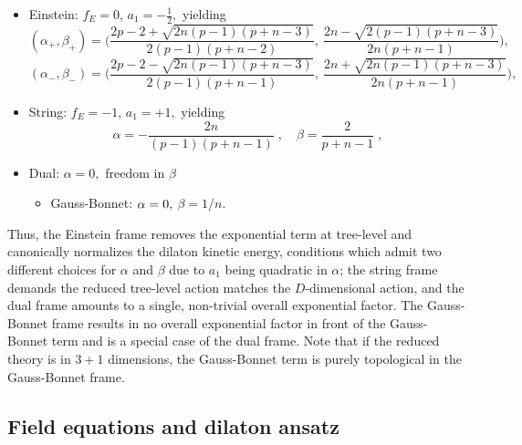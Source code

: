 \documentclass[amsmath,amssymb,11pt]{article}
\newcommand{\beq}{\begin{equation}}
\newcommand{\eeq}{\end{equation}}
\begin{document}
\begin{itemize}

\item Einstein: $f_E=0$, $a_1 = -\frac{1}{2},$ yielding
\begin{equation}\label{abplus}
(\alpha_{+},\beta_{+}) = \Bigg(\frac{2p-2+\sqrt{2n(p-1)(p+n-3)}}{2(p-1)(p+n-2)}, \ \frac{2n-\sqrt{2(p-1)(p+n-3)}}{2n(p+n-1)}\Bigg),
\end{equation}
\begin{equation}\label{abminus}
(\alpha_-,\beta_-) = \Bigg( \frac{2p-2-\sqrt{2n(p-1)(p+n-3)}}{2(p-1)(p+n-1)}, \ \frac{2n+\sqrt{2n(p-1)(p+n-3)}}{2n(p+n-1)}\Bigg),
\end{equation}

\item String: $f_E=-1$, $a_1 = +1,$ yielding
\beq\label{stringframeab}
 \alpha=-\frac{2n}{(p-1)(p+n-1)}\;,\quad \beta=\frac{2}{p+n-1}\;,
\eeq

\item Dual: $\alpha = 0,$ freedom in $\beta$ 
\begin{itemize}
\item Gauss-Bonnet: $\alpha=0,$ $\beta = 1/n.$
\end{itemize}

\end{itemize}
Thus, the Einstein frame removes the exponential term at tree-level and canonically normalizes the dilaton kinetic energy, conditions which admit two different choices for $\alpha$ and $\beta$ due to $a_1$ being quadratic in $\alpha$; the string frame demands the reduced tree-level action matches the $D$-dimensional action, and the dual frame amounts to a single, non-trivial overall exponential factor. The Gauss-Bonnet frame results in no overall exponential factor in front of the Gauss-Bonnet term and is a special case of the dual frame. Note that if the reduced theory is in $3+1$ dimensions, the Gauss-Bonnet term is purely topological in the Gauss-Bonnet frame. 


\subsection{Field equations and dilaton ansatz}
\end{document}
